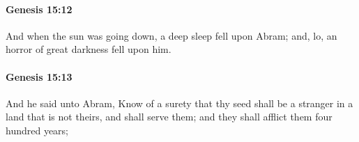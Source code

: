 		\paragraph{Genesis 15:12} %
			\label{GENESIS-15-12}

			And when the sun was going down, a deep sleep fell upon Abram; and, lo, an horror of great darkness fell upon him.


		\paragraph{Genesis 15:13} %
			\label{GENESIS-15-13}

			And he said unto Abram, Know of a surety that thy seed shall be a stranger in a land that is not theirs, and shall serve them; and they shall afflict them four hundred years;


